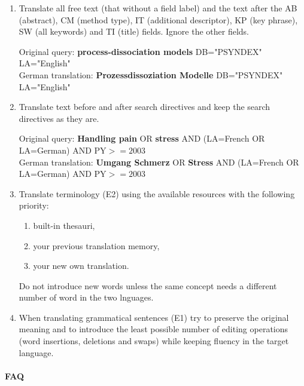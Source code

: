 \documentclass[a4paper,10pt]{article}
\newcommand{\ex}[1]{\begin{tcolorbox}[]{#1}\end{tcolorbox}}
\begin{document}
\begin{enumerate}

 \item Translate all free text (that without a field label) and the text after the AB (abstract), CM (method type), IT (additional descriptor), KP (key phrase), SW (all keywords) and TI (title) fields. Ignore the other fields.
 \ex{Original query: {\bf process-dissociation models} DB="PSYNDEX" LA="English" \\
     German translation: {\bf Prozessdissoziation Modelle} DB="PSYNDEX" LA="English"}

 \item Translate text before and after search directives and keep the search directives as they are.
 \ex{ Original query: {\bf Handling pain} OR {\bf stress} AND (LA=French OR LA=German) AND PY$>=2003$ \\
  German translation: {\bf Umgang Schmerz} OR  {\bf Stress} AND  (LA=French OR LA=German) AND PY$>=2003$}
  
 \item Translate terminology (E2) using the available resources with the following priority: 
 \begin{enumerate}
 \item built-in thesauri, 
 \item your previous translation memory,
 \item your new own translation. 
 \end{enumerate}
 Do not introduce new words unless the same concept needs a different number of word in the two lnguages.

 \item When translating grammatical sentences (E1) try to preserve the original meaning and to introduce the least possible number of editing operations (word insertions, deletions and swaps) while keeping fluency in the target language. 

\end{enumerate}



\paragraph{FAQ}
\end{document}
